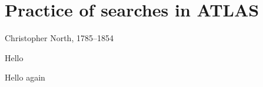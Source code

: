 \chapter{Practice of searches in ATLAS}
\label{chapter:intro}

%
{Christopher North, 1785--1854}%

Hello


\clearpage

Hello again
